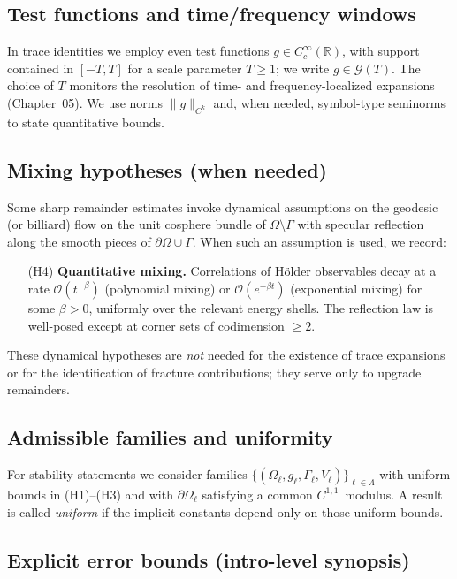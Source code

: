 \subsection{Test functions and time/frequency windows}
\label{sub:intro-testfunctions}

In trace identities we employ even test functions $g\in C_c^\infty(\mathbb{R})$,
with support contained in $[-T,T]$ for a scale parameter $T\ge 1$; we write
$g\in\mathcal{G}(T)$. The choice of $T$ monitors the resolution of time- and
frequency-localized expansions (Chapter~05). We use norms
$\|g\|_{C^k}$ and, when needed, symbol-type seminorms to state quantitative
bounds.

\subsection{Mixing hypotheses (when needed)}
\label{sub:intro-mixing}

Some sharp remainder estimates invoke dynamical assumptions on the
geodesic (or billiard) flow on the unit cosphere bundle of
$\Omega\setminus\Gamma$ with specular reflection along the smooth pieces
of $\partial\Omega\cup\Gamma$. When such an assumption is used, we record:
\begin{itemize}
  \item[(H4)] \textbf{Quantitative mixing.}
  Correlations of Hölder observables decay at a rate
  $\mathcal{O}(t^{-\beta})$ (polynomial mixing) or
  $\mathcal{O}(e^{-\beta t})$ (exponential mixing) for some $\beta>0$,
  uniformly over the relevant energy shells. The reflection law is well-posed
  except at corner sets of codimension $\ge 2$.
\end{itemize}
These dynamical hypotheses are \emph{not} needed for the existence of trace
expansions or for the identification of fracture contributions; they serve
only to upgrade remainders.

\subsection{Admissible families and uniformity}
\label{sub:intro-uniformity}

For stability statements we consider families
$\{(\Omega_\ell,g_\ell,\Gamma_\ell,V_\ell)\}_{\ell\in\Lambda}$ with uniform
bounds in (H1)–(H3) and with $\partial\Omega_\ell$ satisfying a common
$C^{1,1}$~modulus. A result is called \emph{uniform} if the implicit
constants depend only on those uniform bounds.

\subsection{Explicit error bounds (intro-level synopsis)}
\label{sub:intro-error-synopsis}


